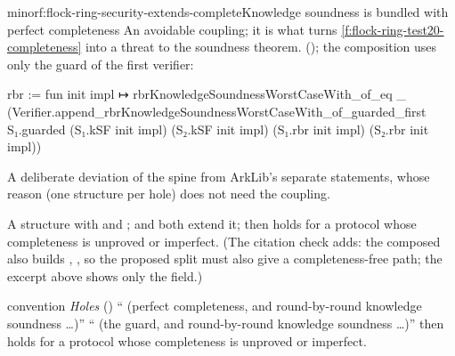 \begin{finding}{minor}{f:flock-ring-security-extends-complete}{Knowledge soundness is bundled with
perfect completeness}
 An avoidable coupling; it is what turns
\cref{f:flock-ring-test20-completeness} into a threat to the soundness theorem.
 (); the composition uses
only the guard of the first verifier:
\begin{leancode}
  rbr := fun init impl ↦ rbrKnowledgeSoundnessWorstCaseWith_of_eq _
    (Verifier.append_rbrKnowledgeSoundnessWorstCaseWith_of_guarded_first S₁.guarded
      (S₁.kSF init impl) (S₂.kSF init impl) (S₁.rbr init impl) (S₂.rbr init impl))
\end{leancode}

 A deliberate deviation of the spine from ArkLib's separate statements,
whose reason (one structure per hole) does not need the coupling.

 A structure  with  and
;  and  both extend it; 
then holds for a protocol whose completeness is unproved or imperfect. (The citation check adds:
the composed  also builds ,
, so the proposed split must also give  a
completeness-free path; the excerpt above shows only the  field.)
\begin{change}{convention \emph{Holes}}
\asis () \enquote{ (perfect completeness, and round-by-round
knowledge soundness \dots)}
\asproposed \enquote{ (the guard, and round-by-round knowledge soundness \dots)}
\reason {} then holds for a protocol whose completeness is
unproved or imperfect.
\end{change}
\end{finding}

